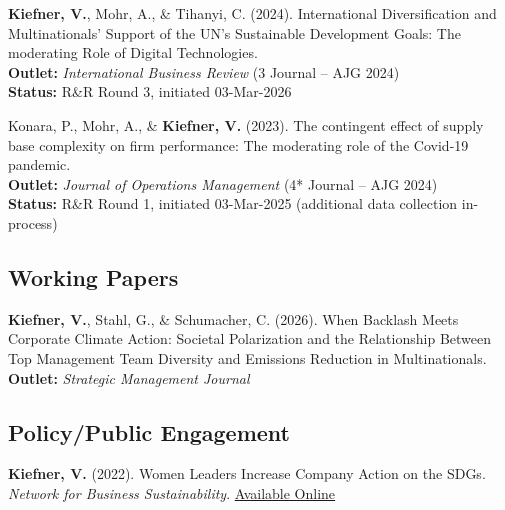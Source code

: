 \documentclass[11pt,a4paper]{article}
\begin{document}
\begin{cv}
\begin{cvlist}{}
    \item[2026]
      \textbf{Kiefner, V.}, Mohr, A., \& Tihanyi, C. (2024). 
      International Diversification and Multinationals' Support of the UN's Sustainable Development Goals: The moderating Role of Digital Technologies. \\
      \textbf{Outlet:} \textit{International Business Review} (3 Journal – AJG 2024) \\
      \textbf{Status:} R\&R Round 3, initiated 03-Mar-2026

    \item[2025]
      Konara, P., Mohr, A., \& \textbf{Kiefner, V.} (2023). 
      The contingent effect of supply base complexity on firm performance: The moderating role of the Covid-19 pandemic.\\
      \textbf{Outlet:} \textit{Journal of Operations Management} (4* Journal – AJG 2024) \\
      \textbf{Status:} R\&R Round 1, initiated 03-Mar-2025 (additional data collection in-process)
\end{cvlist}
 
\subsection{Working Papers}
\begin{cvlist}{}
    \item[In Preparation]
      \textbf{Kiefner, V.}, Stahl, G., \& Schumacher, C. (2026). 
      When Backlash Meets Corporate Climate Action: Societal Polarization and the Relationship Between Top Management Team Diversity and Emissions Reduction in Multinationals.\\
      \textbf{Outlet:} \textit{Strategic Management Journal}\\
\end{cvlist}

\subsection{Policy/Public Engagement}
\begin{cvlist}{}
    \item[2022]
      \textbf{Kiefner, V.} (2022). Women Leaders Increase Company Action on the SDGs. \textit{Network for Business Sustainability}. \href{https://nbs.net/women-leaders-increase-company-action-on-the-sdgs/}{Available Online}\\
\end{cvlist}


\end{cv}
\end{document}
